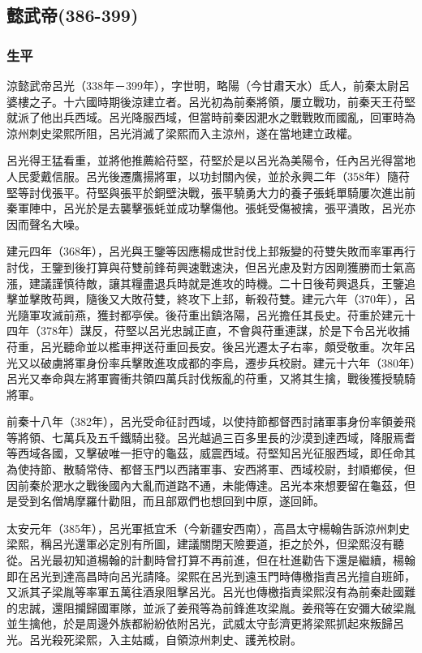 
\subsection{懿武帝\tiny(386-399)}

\subsubsection{生平}

涼懿武帝呂光（338年－399年），字世明，略陽（今甘肅天水）氐人，前秦太尉呂婆樓之子。十六國時期後涼建立者。呂光初為前秦將領，屢立戰功，前秦天王苻堅就派了他出兵西域。呂光降服西域，但當時前秦因淝水之戰戰敗而國亂，回軍時為涼州刺史梁熙所阻，呂光消滅了梁熙而入主涼州，遂在當地建立政權。

呂光得王猛看重，並將他推薦給苻堅，苻堅於是以呂光為美陽令，任內呂光得當地人民愛戴信服。呂光後遷鷹揚將軍，以功封關內侯，並於永興二年（358年）隨苻堅等討伐張平。苻堅與張平於銅壁決戰，張平驍勇大力的養子張蚝單騎屢次進出前秦軍陣中，呂光於是去襲擊張蚝並成功擊傷他。張蚝受傷被擒，張平潰敗，呂光亦因而聲名大噪。

建元四年（368年），呂光與王鑒等因應楊成世討伐上邽叛變的苻雙失敗而率軍再行討伐，王鑒到後打算與苻雙前鋒苟興速戰速決，但呂光慮及對方因剛獲勝而士氣高漲，建議謹慎待敵，讓其糧盡退兵時就是進攻的時機。二十日後苟興退兵，王鑒追擊並擊敗苟興，隨後又大敗苻雙，終攻下上邽，斬殺苻雙。建元六年（370年），呂光隨軍攻滅前燕，獲封都亭侯。後苻重出鎮洛陽，呂光擔任其長史。苻重於建元十四年（378年）謀反，苻堅以呂光忠誠正直，不會與苻重連謀，於是下令呂光收捕苻重，呂光聽命並以檻車押送苻重回長安。後呂光遷太子右率，頗受敬重。次年呂光又以破虜將軍身份率兵擊敗進攻成都的李烏，遷步兵校尉。建元十六年（380年）呂光又奉命與左將軍竇衝共領四萬兵討伐叛亂的苻重，又將其生擒，戰後獲授驍騎將軍。

前秦十八年（382年），呂光受命征討西域，以使持節都督西討諸軍事身份率領姜飛等將領、七萬兵及五千鐵騎出發。呂光越過三百多里長的沙漠到達西域，降服焉耆等西域各國，又擊破唯一拒守的龜茲，威震西域。苻堅知呂光征服西域，即任命其為使持節、散騎常侍、都督玉門以西諸軍事、安西將軍、西域校尉，封順鄉侯，但因前秦於淝水之戰後國內大亂而道路不通，未能傳達。呂光本來想要留在龜茲，但是受到名僧鳩摩羅什勸阻，而且部眾們也想回到中原，遂回師。

太安元年（385年），呂光軍抵宜禾（今新疆安西南），高昌太守楊翰告訴涼州刺史梁熙，稱呂光還軍必定別有所圖，建議關閉天險要道，拒之於外，但梁熙沒有聽從。呂光最初知道楊翰的計劃時曾打算不再前進，但在杜進勸告下還是繼續，楊翰即在呂光到達高昌時向呂光請降。梁熙在呂光到遠玉門時傳檄指責呂光擅自班師，又派其子梁胤等率軍五萬往酒泉阻擊呂光。呂光也傳檄指責梁熙沒有為前秦赴國難的忠誠，還阻攔歸國軍隊，並派了姜飛等為前鋒進攻梁胤。姜飛等在安彌大破梁胤並生擒他，於是周邊外族都紛紛依附呂光，武威太守彭濟更將梁熙抓起來叛歸呂光。呂光殺死梁熙，入主姑臧，自領涼州刺史、護羌校尉。

